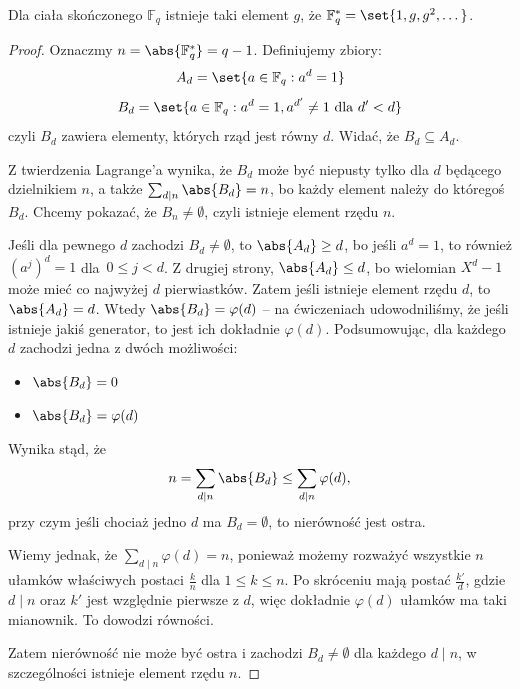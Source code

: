 \begin{theorem}
	Dla ciała skończonego \( \mathbb{F}_q \) istnieje taki element \( g \), że \( \mathbb{F}^{*}_q = \set{1, g, g^2, \text{\dots}} \).
\end{theorem}
\begin{proof}
	Oznaczmy \( n = \abs{\mathbb{F}^{*}_q} = q-1 \). Definiujemy zbiory:
	\[
		A_d = \set{a \in \mathbb{F}_q : a^d = 1}
	\]
	\[
		B_d = \set{a \in \mathbb{F}_q : a^d = 1, a^{d'} \neq 1 \text{ dla } d' < d}
	\]
	czyli \( B_d \) zawiera elementy, których rząd jest równy \( d \). Widać, że \( B_d \subseteq A_d \).

	Z twierdzenia Lagrange'a wynika, że \( B_d \) może być niepusty tylko dla \( d \) będącego dzielnikiem \( n \), a także \( \sum_{d \mid n} \abs{B_d} = n \), bo każdy element należy do któregoś \( B_d \). Chcemy pokazać, że \( B_n \neq \emptyset \), czyli istnieje element rzędu \( n \).

	Jeśli dla pewnego \( d \) zachodzi \( B_d \neq \emptyset \), to \( \abs{A_d} \geq d \), bo jeśli \( a^d = 1 \), to również \( (a^j)^d = 1 \) dla~\( 0 \leq j < d \). Z drugiej strony, \( \abs{A_d} \leq d \), bo wielomian \( X^d-1 \) może mieć co najwyżej \( d \) pierwiastków. Zatem jeśli istnieje element rzędu \( d \), to \( \abs{A_d} = d \).
	Wtedy \( \abs{B_d} = \varphi(d) \) -- na ćwiczeniach udowodniliśmy, że jeśli istnieje jakiś generator, to jest ich dokładnie \( \varphi(d) \).
	Podsumowując, dla każdego \( d \) zachodzi jedna z dwóch możliwości:
	\begin{itemize}
		\item \( \abs{B_d} = 0 \)
		\item \( \abs{B_d} = \varphi(d) \)
	\end{itemize}
	Wynika stąd, że
	\[
		n = \sum_{d \mid n} \abs{B_d} \leq \sum_{d \mid n} \varphi(d),
	\]
	przy czym jeśli chociaż jedno \( d \) ma \( B_d = \emptyset \), to nierówność jest ostra.

	Wiemy jednak, że \( \sum_{d \mid n} \varphi(d) = n \), ponieważ możemy rozważyć wszystkie \( n \) ułamków właściwych postaci \( \frac{k}{n} \) dla \( 1 \leq k \leq n \).
	Po skróceniu mają postać \( \frac{k'}{d} \), gdzie \( d \mid n \) oraz \( k' \) jest względnie pierwsze z \( d \), więc dokładnie \( \varphi(d) \) ułamków ma taki mianownik. To dowodzi równości.

	Zatem nierówność nie może być ostra i zachodzi \( B_d \neq \emptyset \) dla każdego \( d \mid n \), w szczególności istnieje element rzędu \( n \).
\end{proof}
